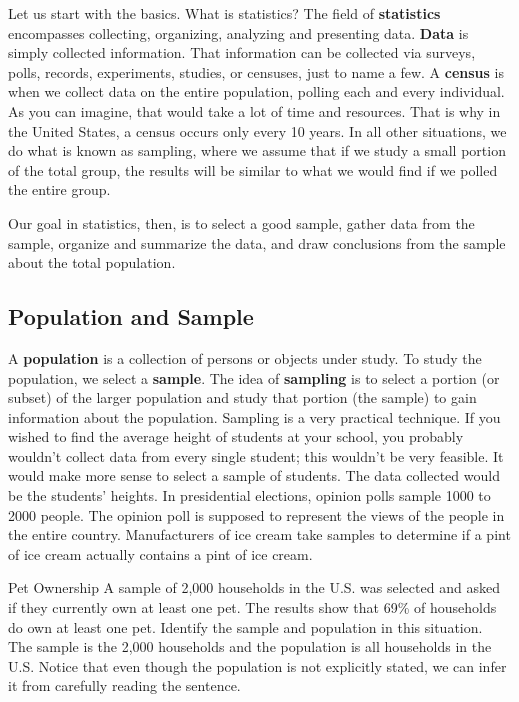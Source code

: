 \setcounter{ExampleCounter}{1}
Let us start with the basics. What is statistics? The field of \textbf{statistics} encompasses collecting, organizing, analyzing and presenting data. \textbf{Data} is simply
collected information. That information can be collected via surveys, polls, records, experiments, studies, or censuses, just to name a few. A \textbf{census} is when we collect data on the entire population, polling each and every individual. As you can imagine, that would take a lot of time and resources. That is why in the United States, a census occurs only every 10 years. In all other situations, we do what is known as sampling, where we assume that if we study a small portion of the total group, the results will be similar to what we would find if we polled the entire group.

Our goal in statistics, then, is to select a good sample, gather data from the sample, organize and summarize the data, and draw conclusions from the sample about the total population.

\subsection{Population and Sample}

A \textbf{population} is a collection of persons or objects under study. To study the population, we select a \textbf{sample}. The idea of \textbf{sampling} is to select a portion (or subset) of the larger population and study that portion (the sample) to gain information about the population. Sampling is a very practical technique. If you wished to find the average height of students at your school, you probably wouldn't collect data from every single student; this wouldn't be very feasible. It would make more sense to select a sample of students. The data collected would be the students' heights.  In presidential elections, opinion polls sample 1000 to 2000 people. The opinion poll is supposed to represent the views of the people in the entire country. Manufacturers of ice cream take samples to determine if a pint of ice cream actually contains a pint of ice cream.

\begin{example}[https://www.youtube.com/watch?v=-AK3lL3YKOA]{Pet Ownership}
A sample of 2,000 households in the U.S. was selected and asked if they currently own at least one pet. The results show that 69\% of households do own at least one pet.
Identify the sample and population in this situation.\\


The sample is the 2,000 households and the population is all households in the U.S. Notice that even though the population is not explicitly stated, we can infer it from carefully reading the sentence. 
\end{example}

